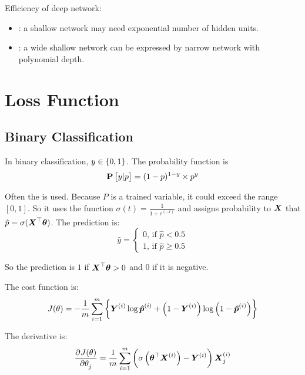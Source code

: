 Efficiency of deep network:
\begin{itemize}
    \item {}: a shallow network may need exponential number of hidden units.
    \item {}: a wide shallow network can be expressed by narrow network with polynomial depth.
\end{itemize}



\section{Loss Function}

\subsection{Binary Classification}

In binary classification, $y \in \set{0,1}$. The probability function is
\begin{equation}
    \mathop{\bf P\/}\left[\displaystyle y|p \right] = (1-p)^{1-y} \times p^y
\end{equation}


Often the  is used. Because $P$ is a trained variable, it could exceed the range $[0, 1]$. So it uses the  function $\sigma(t) = \frac{1}{1 + e^(-t)}$ and assigns probability to $\boldsymbol{X}$ that $\hat{p} = \sigma(\boldsymbol{X}^\top \boldsymbol{\theta} )$. The prediction is:
\begin{equation}
	\hat{y} = \begin{cases}
		0 \text{, if } \hat{p} < 0.5 \\
		1 \text{, if } \hat{p} \geq 0.5
	\end{cases}
\end{equation}

So the prediction is $1$ if $\boldsymbol{X}^\top \boldsymbol{\theta} > 0$ and $0$ if it is negative.

The  cost function is:
\begin{equation}
	J(\theta) = - \frac{1}{m} \sum_{i=1}^m \left\{ \boldsymbol{Y}^{(i)} \log \boldsymbol{\hat{p}}^{(i)} + \left(1- \boldsymbol{Y}^{(i)} \right) \log \left(1 - \boldsymbol{\hat{p}}^{(i)} \right) \right\}
\end{equation}

The derivative is:
\begin{equation}
	\dpd{J(\theta)}{\theta_j} = \frac{1}{m} \sum_{i=1}^m \left( \sigma \left(\columnvector{\theta}^\top \subscription{X}{i} \right) - \subscription{Y}{i} \right) \subscription{X}{i}_j
\end{equation}






